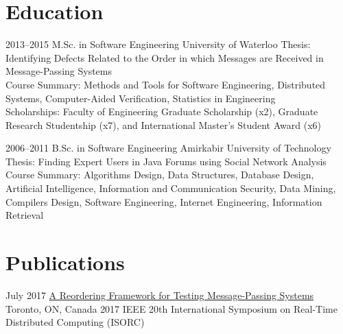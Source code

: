 \documentclass[]{cv-style}                     %
\begin{document}

\section{Education}

\begin{entrylist}

  \entry
  {\small 2013--2015}
  {M.Sc. in Software Engineering {\normalfont [GPA: 87.80/100]}}
  {University of Waterloo}
  {Thesis: Identifying Defects Related to the Order in which Messages are Received in Message-Passing Systems \\
   Course Summary: Methods and Tools for Software Engineering, Distributed Systems, Computer-Aided Verification, Statistics in Engineering \\
   Scholarships: Faculty of Engineering Graduate Scholarship (x2), Graduate Research Studentship (x7), and International Master's Student Award (x6)}

  \entry
  {\small 2006--2011}
  {B.Sc. in Software Engineering {\normalfont [GPA: 16.69/20]}}
  {Amirkabir University of Technology}
  {Thesis: Finding Expert Users in Java Forums using Social Network Analysis \\
   Course Summary: Algorithms Design, Data Structures, Database Design, Artificial Intelligence, Information and Communication Security, Data Mining, Compilers Design, Software Engineering, Internet Engineering, Information Retrieval}

\end{entrylist}



\section{Publications}

\begin{entrylist}

  \entry
  {\small July 2017}
  {\href{http://ieeexplore.ieee.org/abstract/document/7964877}{A Reordering Framework for Testing Message-Passing Systems}}
  {Toronto, ON, Canada}
  {\small{2017 IEEE 20th International Symposium on Real-Time Distributed Computing (ISORC)}}

\end{entrylist}
\end{document}
